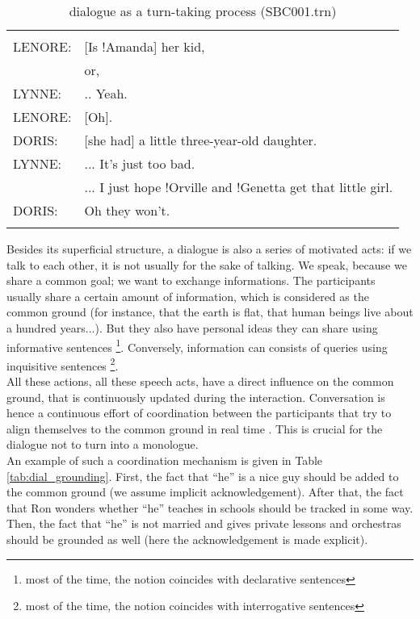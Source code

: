 \documentclass[11pt]{article}
\newenvironment{sbcquote}[2]
{
	\def\savedcaption{\caption{#1}}%
	\def\savedlabel{\label{#2}}%
	\begin{table}[h]
		\centering
		\begin{small}
		\begin{tabular}{ll}
			\hline
			& \\
}
{
	& \\
	\hline
	\end{tabular}
	\end{small}
	\savedcaption
	\savedlabel
\end{table}
}
\begin{document}
			\begin{sbcquote}{dialogue as a turn-taking process (SBC001.trn)}{tab:dial_turn_taking}
				LENORE: & [Is !Amanda] her kid,\\
				& or, \\
				LYNNE: & .. Yeah.\\
				LENORE: & [Oh].\\
				DORIS: & [she had] a little three-year-old daughter.\\
				LYNNE: & ... It's just too bad.\\
				& ... I just hope !Orville and !Genetta get that little girl.\\
				DORIS: & Oh they won't.\\
			\end{sbcquote}


			Besides its superficial structure, a dialogue is also a series of motivated acts: if we talk to each other, it is not usually for the sake of talking. We speak, because we share a common goal; we want to exchange informations. The participants usually share a certain amount of information, which is considered as the common ground (for instance, that the earth is flat, that human beings live about a hundred years...). But they also have personal ideas they can share using informative sentences \footnote{most of the time, the notion coincides with declarative sentences}. Conversely, information can consists of queries using inquisitive sentences \footnote{most of the time, the notion coincides with interrogative sentences}.\\
			
			All these actions, all these speech acts, have a direct influence on the common ground, that is continuously updated during the interaction. Conversation is hence a continuous effort of coordination between the participants that try to align themselves to the common ground in real time \cite{poesio1997, eshghi2015}. This is crucial for the dialogue not to turn into a monologue.\\

			An example of such a coordination mechanism is given in Table \ref{tab:dial_grounding}. First, the fact that ``he'' is a nice guy should be added to the common ground (we assume implicit acknowledgement). After that, the fact that Ron wonders whether ``he'' teaches in schools should be tracked in some way. Then, the fact that ``he'' is not married and gives private lessons and orchestras should be grounded as well (here the acknowledgement is made explicit).\\
			
\end{document}
